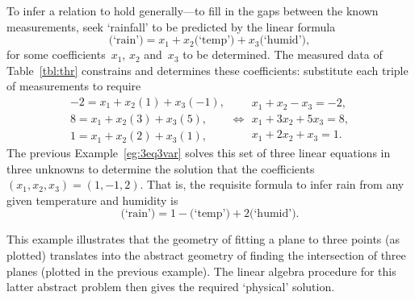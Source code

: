 \begin{example}
\begin{solution} 
To infer a relation to hold generally---to fill in the gaps between the known measurements, seek `rainfall' to be predicted by the linear formula
\begin{equation*}
\text{(`rain')}=x_1+x_2\text{(`temp')}+x_3\text{(`humid')},
\end{equation*}
for some coefficients~\(x_1\), \(x_2\) and~\(x_3\) to be determined.
The measured data of Table~\ref{tbl:thr} constrains and determines these coefficients:
substitute each triple of measurements to require
\begin{equation*}
\begin{array}{l}
-2=x_1+x_2(1)+x_3(-1),
\\ 8=x_1+x_2(3)+x_3(5),
\\1=x_1+x_2(2)+x_3(1),
\end{array}
\iff
\begin{array}{l}
x_1+x_2-x_3=-2,
\\ x_1+3x_2+5x_3=8,
\\x_1+2x_2+x_3=1.
\end{array}
\end{equation*}
The previous Example~\ref{eg:3eq3var} solves this set of three linear equations in three unknowns to determine the solution that the coefficients \((x_1,x_2,x_3)=(1,-1,2)\).
That is, the requisite formula to infer rain from any given temperature and humidity is 
\begin{equation*}
\text{(`rain')}=1-\text{(`temp')}+2\text{(`humid')}.
\end{equation*}

This example illustrates that the geometry of fitting a plane to three points (as plotted) translates into the abstract geometry of finding the intersection of three planes (plotted in the previous example).
The linear algebra procedure for this latter abstract problem then gives the required `physical' solution.
\end{solution}
\end{example}



